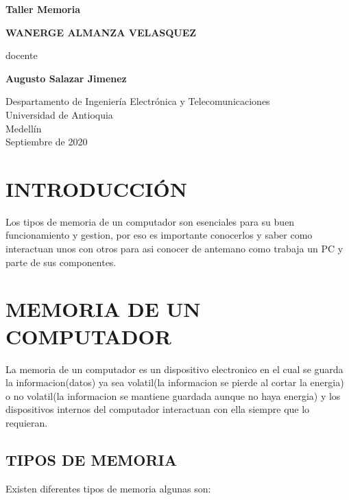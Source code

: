 \documentclass{article}
\begin{document}
\begin{titlepage}
    \begin{center}
        \vspace*{1cm}
            
        \Huge
        \textbf{Taller Memoria}
        \vspace{0.5cm}
        
        \LARGE
        \vspace{1.5cm}
        \textbf{WANERGE ALMANZA VELASQUEZ}
        \vfill

        docente
        
        \vspace{0.5cm}
        \textbf{Augusto Salazar Jimenez}
        \vfill
            
        \Large
        Despartamento de Ingeniería Electrónica y Telecomunicaciones\\
        Universidad de Antioquia\\
        Medellín\\
        Septiembre de 2020
            
    \end{center}
\end{titlepage}

\tableofcontents
\newpage
\section*{\centering INTRODUCCIÓN}\label{intro}
{\raggedleft
Los tipos de memoria de un computador son esenciales para su buen funcionamiento y gestion, por eso es importante conocerlos y saber como interactuan unos con otros para asi conocer de antemano como trabaja un PC y parte de sus componentes.
}

\newpage
\section{MEMORIA DE UN COMPUTADOR}
{\raggedleft
La memoria de un computador es un dispositivo electronico en el cual se guarda la informacion(datos) ya sea volatil(la informacion se pierde al cortar la energia) o no volatil(la informacion se mantiene guardada aunque no haya energia) y los dispositivos internos del computador interactuan con ella siempre que lo requieran.
}
\subsection{TIPOS DE MEMORIA}\label{tipos de memoria}
{\raggedleft
Existen diferentes tipos de memoria algunas son:
}
\end{document}

